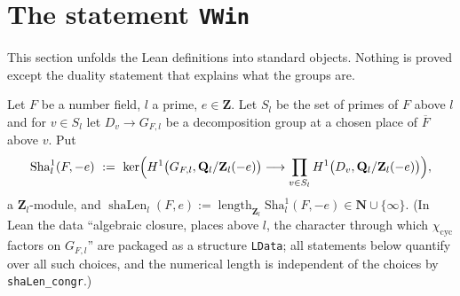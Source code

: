 \section{The statement \texttt{VWin}}\label{sec:S-statement}

This section unfolds the Lean definitions into standard objects. Nothing is proved except the
duality statement that explains what the groups are.

\begin{definition}\label{def:S-sha}
Let $F$ be a number field, $l$ a prime, $e\in\mathbf{Z}$. Let $S_l$ be the set of primes of $F$ above $l$ and for
$v\in S_l$ let $D_v\to G_{F,l}$ be a decomposition group at a chosen place of $\overline{F}$ above $v$. Put
\[
  \mathrm{Sha}^1_l(F,-e)\ :=\ \ker\Bigl(H^1\bigl(G_{F,l},\mathbf{Q}_l/\mathbf{Z}_l(-e)\bigr)\longrightarrow
     \prod_{v\in S_l} H^1\bigl(D_v,\mathbf{Q}_l/\mathbf{Z}_l(-e)\bigr)\Bigr),
\]
a $\mathbf{Z}_l$-module, and $\operatorname{shaLen}_l(F,e):=\operatorname{length}_{\mathbf{Z}_l}\mathrm{Sha}^1_l(F,-e)\in\mathbf{N}\cup\{\infty\}$.
(In Lean the data ``algebraic closure, places above $l$, the character through which $\chi_{\mathrm{cyc}}$ factors on
$G_{F,l}$'' are packaged as a structure \texttt{LData}; all statements below quantify over all such choices,
and the numerical length is independent of the choices by \texttt{shaLen\_congr}.)
\end{definition}

